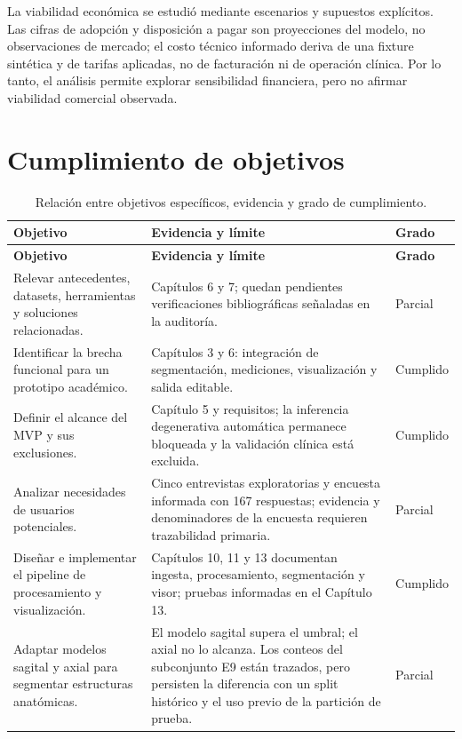 La viabilidad económica se estudió mediante escenarios y supuestos explícitos. Las cifras de adopción y disposición a pagar son proyecciones del modelo, no observaciones de mercado; el costo técnico informado deriva de una fixture sintética y de tarifas aplicadas, no de facturación ni de operación clínica. Por lo tanto, el análisis permite explorar sensibilidad financiera, pero no afirmar viabilidad comercial observada.

\section{Cumplimiento de objetivos}

\begin{longtable}{>{\raggedright\arraybackslash}p{} >{\raggedright\arraybackslash}p{} >{\raggedright\arraybackslash}p{}}
\caption{Relación entre objetivos específicos, evidencia y grado de cumplimiento.}\label{tab:conclusiones-objetivos}\\
\hline
\textbf{Objetivo} & \textbf{Evidencia y límite} & \textbf{Grado} \\
\hline
\endfirsthead
\hline
\textbf{Objetivo} & \textbf{Evidencia y límite} & \textbf{Grado} \\
\hline
\endhead
\hline
\endfoot
Relevar antecedentes, datasets, herramientas y soluciones relacionadas. & Capítulos 6 y 7; quedan pendientes verificaciones bibliográficas señaladas en la auditoría. & Parcial \\
Identificar la brecha funcional para un prototipo académico. & Capítulos 3 y 6: integración de segmentación, mediciones, visualización y salida editable. & Cumplido \\
Definir el alcance del MVP y sus exclusiones. & Capítulo 5 y requisitos; la inferencia degenerativa automática permanece bloqueada y la validación clínica está excluida. & Cumplido \\
Analizar necesidades de usuarios potenciales. & Cinco entrevistas exploratorias y encuesta informada con 167 respuestas; evidencia y denominadores de la encuesta requieren trazabilidad primaria. & Parcial \\
Diseñar e implementar el pipeline de procesamiento y visualización. & Capítulos 10, 11 y 13 documentan ingesta, procesamiento, segmentación y visor; pruebas informadas en el Capítulo 13. & Cumplido \\
Adaptar modelos sagital y axial para segmentar estructuras anatómicas. & El modelo sagital supera el umbral; el axial no lo alcanza. Los conteos del subconjunto E9 están trazados, pero persisten la diferencia con un split histórico y el uso previo de la partición de prueba. & Parcial \\

\end{longtable}
